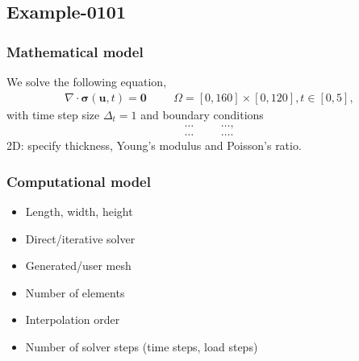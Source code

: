 %
\clearpage
%
\subsection{Example-0101}
%
%
\subsubsection{Mathematical model}
%
We solve the following equation,
%
\begin{align}
    \nabla \cdot \boldsymbol{\sigma} (\boldsymbol{u}, t) = \boldsymbol{0} & &&\Omega = [0, 160] \times [0, 120], t \in [0, 5],
\end{align}
%
with time step size $\Delta_t = 1$ and boundary conditions
%
\begin{align}
    \ldots & && \ldots, \\
    \ldots & && \ldots.
\end{align}
%
2D: specify thickness, Young's modulus and Poisson's ratio.
%
%
\subsubsection{Computational model}
%
\begin{itemize}
    \item{Length, width, height}
    \item{Direct/iterative solver}
    \item{Generated/user mesh}
    \item{Number of elements}
    \item{Interpolation order}
    \item{Number of solver steps (time steps, load steps)}
\end{itemize}
%
%
